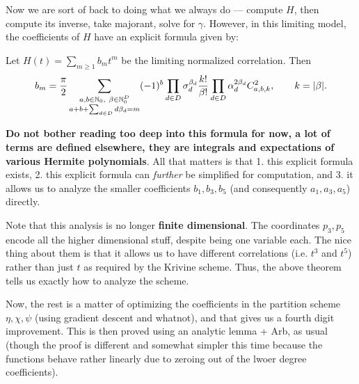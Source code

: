 \documentclass[12pt]{article}
\begin{document}
Now we are sort of back to doing what we always do --- compute $H$, then compute its inverse, take majorant, solve for $\gamma$. However, in this limiting model, the coefficients of $H$ have an explicit formula given by: 
\begin{theorem}\label{thm:coefficient-formula}
Let
\(
  H(t)=\sum_{m\ge1}b_m t^m
\)
be the limiting normalized correlation.  Then
\begin{equation}\label{eq:general-bm}
  b_m={\pi\over2}
  \sum_{\substack{a,b\in\mathbb N_0,\ \beta\in\mathbb N_0^D\\ a+b+\sum_{d\in D}d\beta_d=m}}
  (-1)^b\prod_{d\in D}\sigma_d^{\beta_d}
  {k!\over \beta!}
  \prod_{d\in D}\alpha_d^{2\beta_d}
  C_{a,b,k}^2,
  \qquad k=|\beta|.
\end{equation}
\end{theorem}
\textbf{Do not bother reading too deep into this formula for now, a lot of terms are defined elsewhere, they are integrals and expectations of various Hermite polynomials}. All that matters is that 1. this explicit formula exists, 2. this explicit formula can \textit{further} be simplified for computation, and 3. it allows us to analyze the smaller coefficients $b_1, b_3, b_5$ (and consequently $a_1, a_3, a_5$) directly. 

Note that this analysis is no longer \textbf{finite dimensional}. The coordinates $p_3, p_5$ encode all the higher dimensional stuff, despite being one variable each. The nice thing about them is that it allows us to have different correlations (i.e. $t^3$ and $t^5$) rather than just $t$ as required by the Krivine scheme. Thus, the above theorem tells us exactly how to analyze the scheme. 

Now, the rest is a matter of optimizing the coefficients in the partition scheme $\eta, \chi, \psi$ (using gradient descent and whatnot), and that gives us a fourth digit improvement. This is then proved using an analytic lemma + Arb, as usual (though the proof is different and somewhat simpler this time because the functions behave rather linearly due to zeroing out of the lwoer degree coefficients). 






\end{document}
